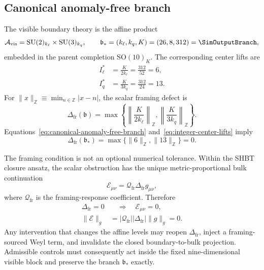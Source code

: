 \subsection{Canonical anomaly-free branch}

The visible boundary theory is the affine product
\begin{equation}
  \mathcal{A}_{\mathrm{vis}}
  =
  \mathrm{SU}(2)_{k_\ell}
  \times
  \mathrm{SU}(3)_{k_q},
  \qquad
  \mathfrak{b}_*
  =
  (k_\ell,k_q,K)
  =
  (26,8,312)
  =
  \SimOutputBranch,
  \label{eq:canonical-anomaly-free-branch}
\end{equation}
embedded in the parent completion \(\mathrm{SO}(10)_K\).  The corresponding center lifts are
\begin{equation}
  \begin{aligned}
  I_\ell^*
  &=
  \frac{K}{2k_\ell}
  =
  \frac{312}{52}
  =
  6,
  \\
  I_q^*
  &=
  \frac{K}{3k_q}
  =
  \frac{312}{24}
  =
  13.
  \end{aligned}
  \label{eq:integer-center-lifts}
\end{equation}
For \(\|x\|_{\mathbb Z}\equiv\min_{n\in\mathbb Z}|x-n|\), the scalar framing defect is
\begin{equation}
  \Delta_{\mathrm{fr}}(\mathfrak b)
  =
  \max\left\{
    \left\|\frac{K}{2k_\ell}\right\|_{\mathbb Z},
    \left\|\frac{K}{3k_q}\right\|_{\mathbb Z}
  \right\}.
  \label{eq:framing-defect-general}
\end{equation}
Equations~\eqref{eq:canonical-anomaly-free-branch} and~\eqref{eq:integer-center-lifts} imply
\begin{equation}
  \Delta_{\mathrm{fr}}(\mathfrak b_*)
  =
  \max\{\|6\|_{\mathbb Z},\|13\|_{\mathbb Z}\}
  =
  0.
  \label{eq:zero-framing-defect}
\end{equation}

The framing condition is not an optional numerical tolerance.  Within the SHBT closure ansatz, the scalar obstruction has the unique metric-proportional bulk continuation
\begin{equation}
  \mathcal{E}_{\mu\nu}
  =
  \mathcal{Q}_{\mathrm{fr}}
  \Delta_{\mathrm{fr}}
  g_{\mu\nu},
  \label{eq:weyl-closure-tensor}
\end{equation}
where \(\mathcal{Q}_{\mathrm{fr}}\) is the framing-response coefficient.  Therefore
\begin{equation}
  \begin{aligned}
  \Delta_{\mathrm{fr}}=0
  &\quad\Longrightarrow\quad
  \mathcal{E}_{\mu\nu}=0,
  \\
  \|\mathcal E\|_g
  &=
  |\mathcal Q_{\mathrm{fr}}|
  |\Delta_{\mathrm{fr}}|
  \|g\|_g
  =
  0.
  \end{aligned}
  \label{eq:closure-tensor-vanishes}
\end{equation}
Any intervention that changes the affine levels may reopen \(\Delta_{\mathrm{fr}}\), inject a framing-sourced Weyl term, and invalidate the closed boundary-to-bulk projection.  Admissible controls must consequently act inside the fixed nine-dimensional visible block and preserve the branch \(\mathfrak b_*\) exactly.

